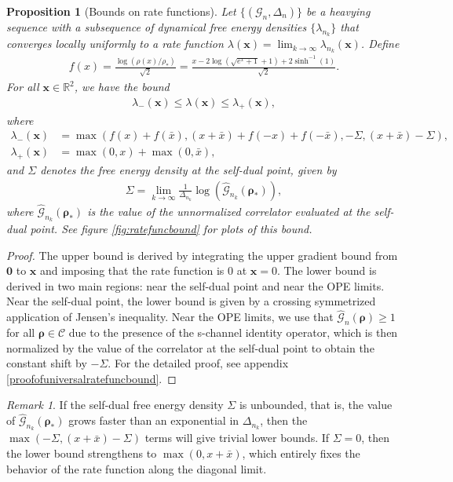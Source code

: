 \documentclass[a4paper,11pt]{article}
\theoremstyle{plain}
\newtheorem{prop}[thm]{Proposition}
\theoremstyle{definition}
\theoremstyle{remark}
\newtheorem*{rem}{Remark}
\newcommand{\bs}[1]{\boldsymbol{#1}}
\newcommand{\ba}{\begin{equation} \begin{aligned}}
\newcommand{\ea}{\end{aligned} \end{equation}}
\newcommand{\De}{\Delta}
\begin{document}
\begin{prop}[Bounds on rate functions]
\label{universalratefunctionbound}
    Let $\{(\mathcal{G}_n,\De_n)\}$ be a heavying sequence with a subsequence of dynamical free energy densities $\{\lambda_{n_k}\}$ that converges locally uniformly to a rate function $\lambda(\bs{x})=\lim_{k\to\infty}\lambda_{n_k}(\bs{x}) $. Define
    \ba
    f(x) = \frac{\log(\rho(x)/\rho_*)}{\sqrt{2}}=\frac{x-2 \log \left(\sqrt{e^x+1}+1\right)+2 \sinh ^{-1}(1)}{\sqrt{2}}.
    \ea
    For all $\bs{x} \in \mathbb{R}^2$, we have the bound
    \ba
  \lambda_-(\bs{x}) \leq \lambda(\bs{x}) \leq \lambda_+(\bs{x}) ,
    \ea
    where
    \ba
    \lambda_-(\bs{x}) &= \max\left( f(x)+f(\bar{x}), (x+\bar{x}) + f(-x) + f(-\bar{x}), -\Sigma , (x+\bar{x}) - \Sigma \right),\\
    \lambda_+(\bs{x}) &= \max(0,x) + \max(0,\bar{x}),
    \ea
    and $\Sigma$ denotes the free energy density at the self-dual point, given by
    \ba
    \Sigma = \lim_{k \to \infty} \frac{1}{\De_{n_k}} \log\left(\widehat{\mathcal{G}}_{n_k}(\bs{\rho}_*) \right),
    \ea
    where $\widehat{\mathcal{G}}_{n_k}(\bs{\rho}_*)$ is the value of the unnormalized correlator evaluated at the self-dual point. See figure \ref{fig:ratefuncbound} for plots of this bound. 
\end{prop}
\begin{proof}
     The upper bound is derived by integrating the upper gradient bound from $\bs{0}$ to $\bs{x}$ and imposing that the rate function is 0 at $\bs{x} = 0$. The lower bound is derived in two main regions: near the self-dual point and near the OPE limits. Near the self-dual point, the lower bound is given by a crossing symmetrized application of Jensen's inequality. Near the OPE limits, we use that $\widehat{\mathcal{G}}_n(\bs{\rho}) \geq 1$ for all $\bs{\rho} \in \mathscr{C}$ due to the presence of the s-channel identity operator, which is then normalized by the value of the correlator at the self-dual point to obtain the constant shift by $-\Sigma$. For the detailed proof, see appendix \ref{proofofuniversalratefuncbound}.
\end{proof}
\begin{rem}
    If the self-dual free energy density $\Sigma$ is unbounded, that is, the value of $\widehat{\mathcal{G}}_{n_k}(\bs{\rho}_*)$ grows faster than an exponential in $\De_{n_k}$, then the $\max(-\Sigma, (x+\bar{x}) - \Sigma)$ terms will give trivial lower bounds. If $\Sigma = 0$, then the lower bound strengthens to $\max(0,x+\bar{x})$, which entirely fixes the behavior of the rate function along the diagonal limit.
\end{rem}
\end{document}
